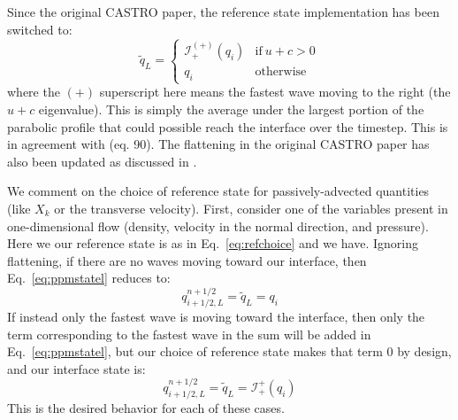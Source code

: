 \documentclass[iop]{emulateapj}
\begin{document}
Since the original CASTRO paper, the reference state implementation
has been switched to:
\begin{equation}
\label{eq:refchoice}
\tilde{q}_L = \left \{ \begin{array}{cc}
       \mathcal{I}_+^{(+)}(q_i) & \mathrm{if~} u + c > 0 \\
       q_i                    & \mathrm{otherwise}
\end{array}
\right .
\end{equation}
where the $(+)$ superscript here means the fastest wave moving to the right
(the $u+c$ eigenvalue).   This is simply the average under the largest
portion of the parabolic profile that could possible reach the interface 
over the timestep.  This is
in agreement with \citet{ppmunsplit} (eq. 90).  The flattening
in the original CASTRO paper has also been updated as discussed
in \citet{zingalekatz:2015}.

We comment on the choice of reference state for passively-advected
quantities (like $X_k$ or the transverse velocity).
First, consider one of the variables present in one-dimensional flow
(density, velocity in the normal direction, and pressure).  Here we
our reference state is as in Eq.~\ref{eq:refchoice} and we have.
Ignoring flattening, if there are no waves moving toward our
interface, then Eq.~\ref{eq:ppmstatel} reduces to:
\begin{equation}
q_{i+1/2,L}^{n+1/2} = \tilde{q}_L = q_i
\end{equation}
If instead only the fastest wave is moving toward the interface, then
only the term corresponding to the fastest wave in the sum will be
added in Eq.~\ref{eq:ppmstatel}, but our choice of reference state makes
that term 0 by design, and our interface state is:
\begin{equation}
q_{i+1/2,L}^{n+1/2} = \tilde{q}_L = \mathcal{I}_+^{+}(q_i)
\end{equation}
This is the desired behavior for each of these cases. 
\end{document}
